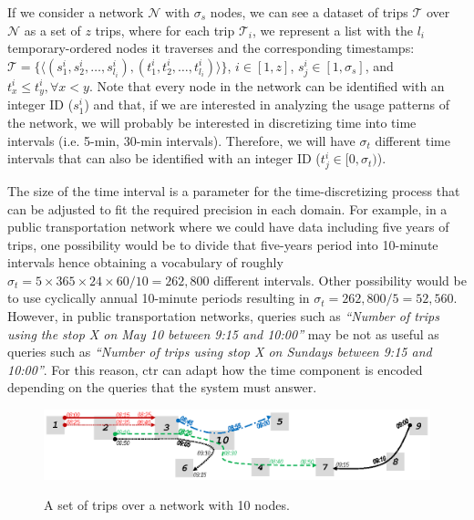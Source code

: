 	If we consider a network $\mathcal{N}$ with $\sigma_s$ nodes, 
	we can see a dataset of trips $\mathcal{T}$ over $\mathcal{N}$ as 
	a set of $z$ trips, where for each trip $\mathcal{T}_i$, we represent a list with the $l_i$ 
	temporary-ordered nodes it traverses and the corresponding timestamps: 
	$\mathcal{T}= \{ \langle (s^i_1, s^i_2, \dots,  s^i_{l_i}),(t^i_1, t^i_2, \dots,  t^i_{l_i}) \rangle\}$, $i\in[1,z]$, 
	$s^i_j \in [1,\sigma_s]$, and $t^i_{x} \leq t^i_y, \forall x < y$. 
	Note that every node in the network can be identified with an integer ID ($s^i_1$) and that, if we are interested in
	analyzing the usage patterns of the network, we will probably be interested in discretizing time into 
	time intervals (i.e. 5-min, 30-min intervals). Therefore,
	we will have $\sigma_t$ different time intervals that can also be identified with an
	integer ID ($t^i_j \in [0,\sigma_t)$).

	The size of the time interval is a parameter for the time-discretizing process
	that can be adjusted to fit the required precision in each domain.
	For example, in a public
	transportation network where we could have data including five years of trips, one
	possibility would be to divide that five-years period into
	10-minute intervals hence obtaining a
	vocabulary of roughly $\sigma_t=5\times 365 \times 24 \times 60/10 = 262,800$ different intervals. 
	Other possibility would
	be to use cyclically annual 10-minute periods resulting in $\sigma_t=262,800 / 5 = 52,560$. 
	However,  in public transportation networks, queries such
	as \textit{``Number of trips using the stop X on May 10 between 9:15 and 10:00''} may be not 
	as useful as queries such as \textit{``Number of trips using stop X on Sundays between 9:15 and
		10:00''}.
	For this reason, \gls{ctr} can adapt how the
	time component is encoded depending on the queries that the system must answer.


	\begin{figure}[ht]
		\begin{center}
			{\includegraphics[width=1\textwidth]{figures/network.eps}}
		\end{center}
		\vspace{-0.2cm}
		\caption{A set of trips over a network with 10 nodes.}
		\label{fig:network}
	\end{figure}


